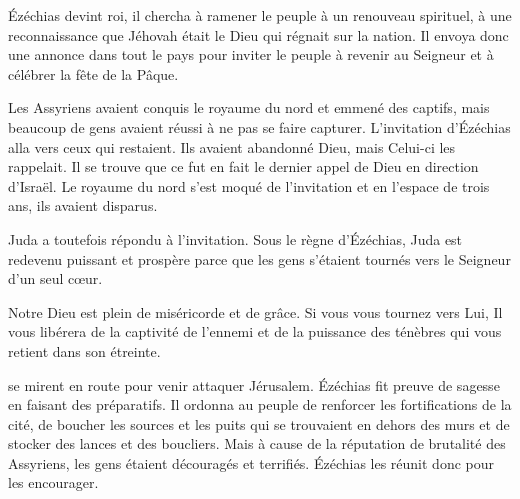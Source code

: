  Ézéchias devint roi, il chercha à ramener le peuple
 à un renouveau spirituel, à une reconnaissance que Jéhovah était le Dieu
 qui régnait sur la nation.
 Il envoya donc une annonce dans tout le pays pour inviter le peuple
 à revenir au Seigneur et à célébrer la fête de la Pâque.

Les Assyriens avaient conquis le royaume du nord et emmené des captifs,
 mais beaucoup de gens avaient réussi à ne pas se faire capturer.
 L'invitation d'Ézéchias alla vers ceux qui restaient.
 Ils avaient abandonné Dieu, mais Celui-ci les rappelait.
 Il se trouve que ce fut en fait le dernier appel de Dieu en direction d'Israël.
 Le royaume du nord s'est moqué de l'invitation et en l'espace de trois ans,
 ils avaient disparus. 


Juda a toutefois répondu à l'invitation. Sous le règne d'Ézéchias,
 Juda est redevenu puissant et prospère parce que les gens s'étaient
 tournés vers le Seigneur d'un seul cœur.

Notre Dieu est plein de miséricorde et de grâce.
 Si vous vous tournez vers Lui, Il vous libérera de la captivité
 de l'ennemi et de la puissance des ténèbres qui vous retient
 dans son étreinte. 

\dvrule








 se mirent en route pour venir attaquer Jérusalem.
 Ézéchias fit preuve de sagesse en faisant des préparatifs.
 Il ordonna au peuple de renforcer les fortifications de la cité,
 de boucher les sources et les puits qui se trouvaient en dehors des murs
 et de stocker des lances et des boucliers.
 Mais à cause de la réputation de brutalité des Assyriens,
 les gens étaient découragés et terrifiés.
 Ézéchias les réunit donc pour les encourager.

